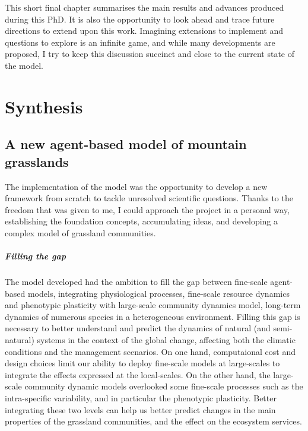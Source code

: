 
\begin{fullwidth}
This short final chapter summarises the main results and advances produced during this PhD. It is also the opportunity to look ahead and trace future directions to extend upon this work. Imagining extensions to implement and questions to explore is an infinite game, and while many developments are proposed, I try to keep this discussion succinct and close to the current state of the model.
\end{fullwidth}

\chapter{Synthesis}
%
%
%
\section{A new agent-based model of mountain grasslands}

The implementation of the model \model was the opportunity to develop a new framework from scratch to tackle unresolved scientific questions. Thanks to the freedom that was given to me, I could approach the project in a personal way, establishing the foundation concepts, accumulating ideas, and developing a complex model of grassland communities.

\paragraph{Filling the gap}

The model developed had the ambition to fill the gap between fine-scale agent-based models, integrating physiological processes, fine-scale resource dynamics and phenotypic plasticity with large-scale community dynamics model, long-term dynamics of numerous species in a heterogeneous environment. Filling this gap is necessary to better understand and predict the dynamics of natural (and semi-natural) systems in the context of the global change, affecting both the climatic conditions and the management scenarios. On one hand, computaional cost and design choices limit our ability to deploy fine-scale models at large-scales to integrate the effects expressed at the local-scales. On the other hand, the large-scale community dynamic models overlooked some fine-scale processes such as the intra-specific variability, and in particular the phenotypic plasticity. Better integrating these two levels can help us better predict changes in the main properties of the grassland communities, and the effect on the ecosystem services.

